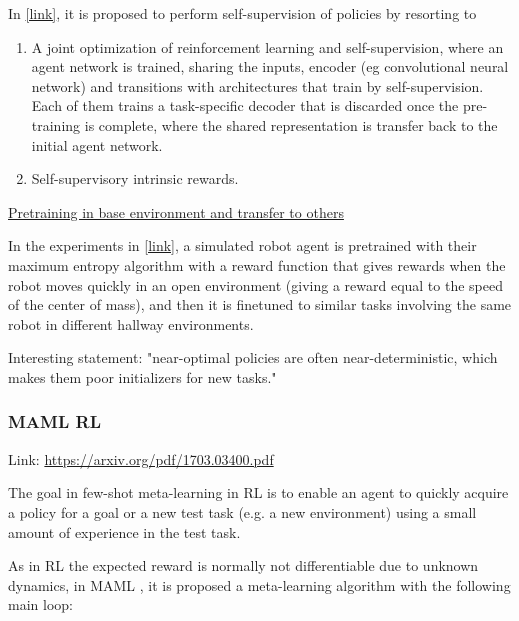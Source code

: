 \documentclass[12pt, english]{article}
\begin{document}
In \cite{shelhamer_loss_2017} \href{https://arxiv.org/abs/1612.07307}{[link]}, it is proposed to perform self-supervision of policies by resorting to

\begin{enumerate}
  \item A joint optimization of reinforcement learning and self-supervision, where an agent network is trained, sharing the inputs, encoder (eg convolutional neural network) and transitions with architectures that train by self-supervision. Each of them trains a task-specific decoder that is discarded once the pre-training is complete, where the shared representation is transfer back to the initial agent network.
  \item Self-supervisory intrinsic rewards.
\end{enumerate}

\underline{Pretraining in base environment and transfer to others}

In the experiments in \cite{haarnoja_reinforcement_2017} \href{https://arxiv.org/pdf/1702.08165.pdf}{[link]}, a simulated robot agent is pretrained with their maximum entropy algorithm with a reward function that gives rewards when the robot moves quickly in an open environment (giving a reward equal to the speed of the center of mass), and then it is finetuned to similar tasks involving the same robot in different hallway environments.

Interesting statement: "near-optimal policies are often near-deterministic, which makes them poor initializers for new tasks."


\subsubsection{MAML RL}

Link: \url{https://arxiv.org/pdf/1703.03400.pdf}

The goal in few-shot meta-learning in RL is to enable an agent to quickly acquire a policy for a goal or a new test task (e.g. a new environment) using a small amount of experience in the test task.

As in RL the expected reward is normally not differentiable due to unknown dynamics, in MAML \cite{finn_model-agnostic_2017}, it is proposed a meta-learning algorithm with the following main loop:
\end{document}
